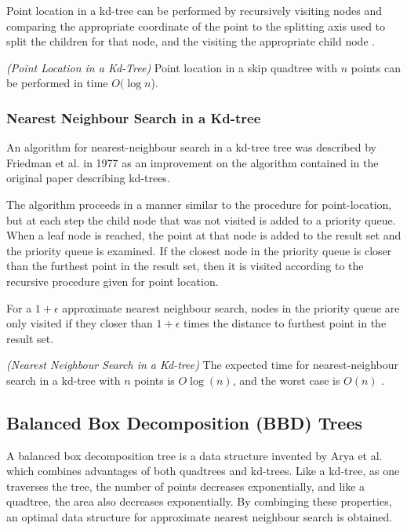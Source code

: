 \documentclass[mcs]{scsthesis}
\begin{document}
Point location in a kd-tree can be performed by recursively visiting nodes and
comparing the appropriate coordinate of the point to the splitting axis used
to split the children for that node, and the visiting the appropriate child
node \cite{kdtree}.

\begin{thm} \emph{(Point Location in a Kd-Tree)} 
Point location in a skip quadtree with $n$ points can be performed in time
\(O(\log n\)). 
\end{thm}

\subsubsection{Nearest Neighbour Search in a Kd-tree}

An algorithm for nearest-neighbour search in a kd-tree tree was described
by Friedman et al. \cite{friedman} in 1977 as an improvement on the algorithm
contained in the original paper describing kd-trees.

The algorithm proceeds in a manner similar to the procedure for point-location,
but at each step the child node that was not visited is added to a priority
queue. When a leaf node is reached, the point at that node is added to the
result set and the priority queue is examined. If the closest node in the
priority queue is closer than the furthest point in the result set, then it
is visited according to the recursive procedure given for point location. 

For a \(1 + \epsilon\) approximate nearest neighbour search, nodes in the
priority queue are only visited if they closer than \(1 + \epsilon\) times
the distance to furthest point in the result set.

\begin{thm} \emph{(Nearest Neighbour Search in a Kd-tree)} 
The expected time for nearest-neighbour search in a kd-tree with $n$ points is
\(O \log(n)\), and the worst case is \(O(n)\) \cite{friedman}.
\end{thm}

\subsection{Balanced Box Decomposition (BBD) Trees}

A balanced box decomposition tree is a data structure invented by Arya et al.
\cite{optimalann} which combines advantages of both quadtrees and kd-trees.
Like a kd-tree, as one traverses the tree, the number of points decreases
exponentially, and like a quadtree, the area also decreases exponentially. By
combinging these properties, an optimal data structure for approximate nearest
neighbour search is obtained.
\end{document}
